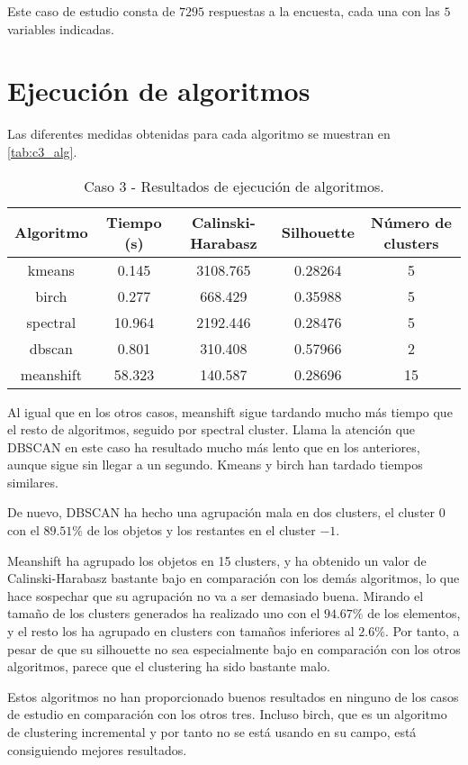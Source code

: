Este caso de estudio consta de $7295$ respuestas a la encuesta, cada una con las $5$ variables indicadas.

\section{Ejecución de algoritmos}

Las diferentes medidas obtenidas para cada algoritmo se muestran en \eqref{tab:c3_alg}.

\begin{table}[H]
\centering
\caption{Caso 3 - Resultados de ejecución de algoritmos.}
\label{tab:c3_alg}
\begin{tabular}{ccccc}
\toprule
 Algoritmo & Tiempo (s) & Calinski-Harabasz & Silhouette & Número de clusters \\
\midrule
kmeans & 0.145 & 3108.765 & 0.28264 & 5 \\
birch & 0.277 & 668.429 & 0.35988 & 5 \\
spectral & 10.964 & 2192.446 & 0.28476 & 5 \\
dbscan & 0.801 & 310.408 & 0.57966 & 2 \\
meanshift & 58.323 & 140.587 & 0.28696 & 15 \\
\bottomrule
\end{tabular}
\end{table}

Al igual que en los otros casos, meanshift sigue tardando mucho más tiempo que el resto de algoritmos, seguido por spectral cluster. Llama la atención que DBSCAN en este caso ha resultado mucho más lento que en los anteriores, aunque sigue sin llegar a un segundo. Kmeans y birch han tardado tiempos similares.

De nuevo, DBSCAN ha hecho una agrupación mala en dos clusters, el cluster $0$ con el $89.51\%$ de los objetos y los restantes en el cluster $-1$.

Meanshift ha agrupado los objetos en 15 clusters, y ha obtenido un valor de Calinski-Harabasz bastante bajo en comparación con los demás algoritmos, lo que hace sospechar que su agrupación no va a ser demasiado buena. Mirando el tamaño de los clusters generados ha realizado uno con el $94.67\%$ de los elementos, y el resto los ha agrupado en clusters con tamaños inferiores al $2.6\%$. Por tanto, a pesar de que su silhouette no sea especialmente bajo en comparación con los otros algoritmos, parece que el clustering ha sido bastante malo.

Estos algoritmos no han proporcionado buenos resultados en ninguno de los casos de estudio en comparación con los otros tres. Incluso birch, que es un algoritmo de clustering incremental y por tanto no se está usando en su campo, está consiguiendo mejores resultados.

